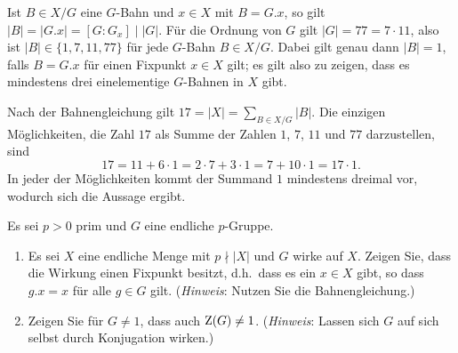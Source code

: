 \begin{solution}
  Ist $B \in X/G$ eine $G$-Bahn und $x \in X$ mit $B = G.x$, so gilt $|B| = |G.x| = [G : G_x] \mid |G|$.
  Für die Ordnung von $G$ gilt $|G| = 77 = 7 \cdot 11$, also ist $|B| \in \{1, 7, 11, 77\}$ für jede $G$-Bahn $B \in X/G$.
  Dabei gilt genau dann $|B| = 1$, falls $B = G.x$ für einen Fixpunkt $x \in X$ gilt;
  es gilt also zu zeigen, dass es mindestens drei einelementige $G$-Bahnen in $X$ gibt.
  
  Nach der Bahnengleichung gilt $17 = |X| = \sum_{B \in X/G} |B|$.
  Die einzigen Möglichkeiten, die Zahl $17$ als Summe der Zahlen $1$, $7$, $11$ und $77$ darzustellen, sind
  \[
      17
    = 11 + 6 \cdot 1
    = 2 \cdot 7 + 3 \cdot 1
    = 7 + 10 \cdot 1
    = 17 \cdot 1.
  \]
  In jeder der Möglichkeiten kommt der Summand $1$ mindestens dreimal vor, wodurch sich die Aussage ergibt.
\end{solution}



\begin{question}[subtitle = Mehr Bahnenkombinatorik]
  Es sei $p > 0$ prim und $G$ eine endliche $p$-Gruppe.
  \begin{enumerate}
    \item
      Es sei $X$ eine endliche Menge mit $p \nmid |X|$ und $G$ wirke auf $X$.
      Zeigen Sie, dass die Wirkung einen Fixpunkt besitzt, d.h.\ dass es ein $x \in X$ gibt, so dass $g.x = x$ für alle $g \in G$ gilt.
      (\emph{Hinweis}:
       Nutzen Sie die Bahnengleichung.)
    \item
      Zeigen Sie für $G \neq 1$, dass auch $\operatorname{Z}(G) \neq 1$.
      (\emph{Hinweis}:
       Lassen sich $G$ auf sich selbst durch Konjugation wirken.)
  \end{enumerate}
\end{question}


